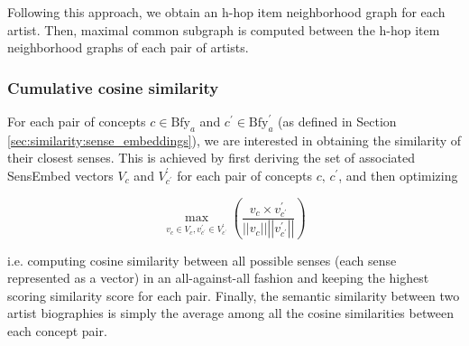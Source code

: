 Following this approach, we obtain an h-hop item neighborhood graph for each artist. Then, maximal common subgraph is computed between the h-hop item neighborhood graphs of each pair of artists. %

\subsubsection{Cumulative cosine similarity} %

For each pair of concepts $c \in \text{Bfy}_{a}$ and $c^{\prime} \in \text{Bfy}^{\prime}_{a}$ (as defined in Section \ref{sec:similarity:sense_embeddings}), we are interested in obtaining the similarity of their closest senses. This is achieved by first deriving the set of associated SensEmbed vectors $V_c$ and $V_{c^{\prime}}^{\prime}$ for each pair of concepts $c,\,c^{\prime}$, and then optimizing

\begin{equation}
\operatorname{max}_{v_c \in V_c , v_{c^{\prime}}^{\prime} \in V_{c^{\prime}}^{\prime}}
\left( \frac{v_c \times v_{c^{\prime}}^{\prime}}{\left\vert\left\vert{v_c}\right\vert\right\vert \left\vert\left\vert{v_{c^{\prime}}^{\prime}}\right\vert\right\vert } \right)
\end{equation}

i.e. computing cosine similarity between all possible senses (each sense represented as a vector) in an all-against-all fashion and keeping the highest scoring similarity score for each pair. Finally, the semantic similarity between two artist biographies is simply the average among all the cosine similarities between each concept pair.

